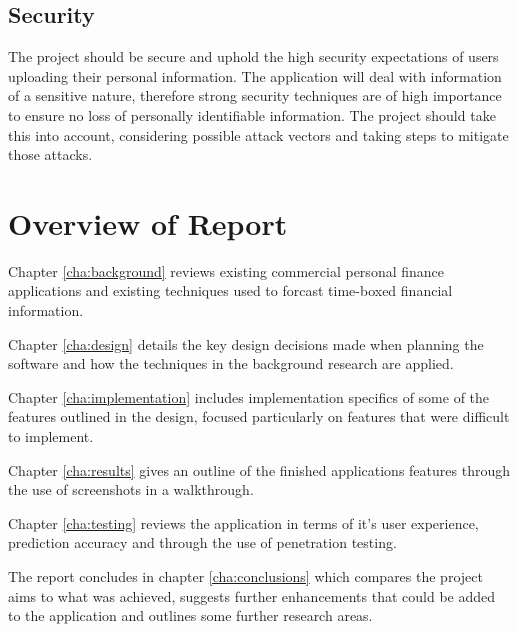 \subsection{Security}
The project should be secure and uphold the high security expectations of users uploading their personal information.
%
The application will deal with information of a sensitive nature, therefore strong security techniques are of high importance to ensure no loss of personally identifiable information. 
% 
The project should take this into account, considering possible attack vectors and taking steps to mitigate those attacks.

\section{Overview of Report}

Chapter \ref{cha:background} reviews existing commercial personal finance applications and existing techniques used to forcast time-boxed financial information.

Chapter \ref{cha:design} details the key design decisions made when planning the software and how the techniques in the background research are applied.

Chapter \ref{cha:implementation} includes implementation specifics of some of the features outlined in the design, focused particularly on features that were difficult to implement.

Chapter \ref{cha:results} gives an outline of the finished applications features through the use of screenshots in a walkthrough.

Chapter \ref{cha:testing} reviews the application in terms of it's user experience, prediction accuracy and through the use of penetration testing.

The report concludes in chapter \ref{cha:conclusions} which compares the project aims to what was achieved, suggests further enhancements that could be added to the application and outlines some further research areas.